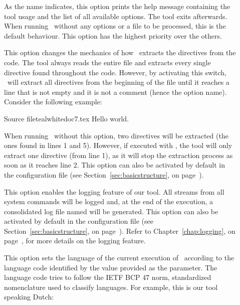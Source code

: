 \begin{description}
\item[] As the name indicates, this option prints the help message containing the tool usage and the list of all available options. The tool exits afterwards. When running \arara\ without any options or a file to be processed, this is the default behaviour. This option has the highest priority over the others.

\item[] This option changes the mechanics of how \arara\ extracts the directives from the code. The tool always reads the entire file and extracts every single directive found throughout the code. However, by activating this switch, \arara\ will extract all directives from the beginning of the file until it reaches a line that is not empty and it is not a comment (hence the option name). Consider the following example:

\begin{ncodebox}{Source file}{teal}{\icnote}{white}{doc7.tex}
Hello world.
\bye

\end{ncodebox}

When running \arara\ without this option, two directives will be extracted (the ones found in lines 1 and 5). However, if executed with , the tool will only extract one directive (from line 1), as it will stop the extraction process as soon as it reaches line 2. This option can also be activated by default in the configuration file (see Section~\ref{sec:basicstructure}, on page~\pageref{sec:basicstructure}).

\item[] This option enables the logging feature of our tool. All streams from all system commands will be logged and, at the end of the execution, a consolidated log file named  will be generated. This option can also be activated by default in the configuration file (see Section~\ref{sec:basicstructure}, on page~\pageref{sec:basicstructure}). Refer to Chapter~\ref{chap:logging}, on page~\pageref{chap:logging}, for more details on the logging feature.

\item[] This option sets the language of the current execution of \arara\ according to the language code identified by the  value provided as the parameter. The language code tries to follow the IETF BCP 47 norm, standardized nomenclature used to classify languages. For example, this is our tool speaking Dutch:


\end{description}
